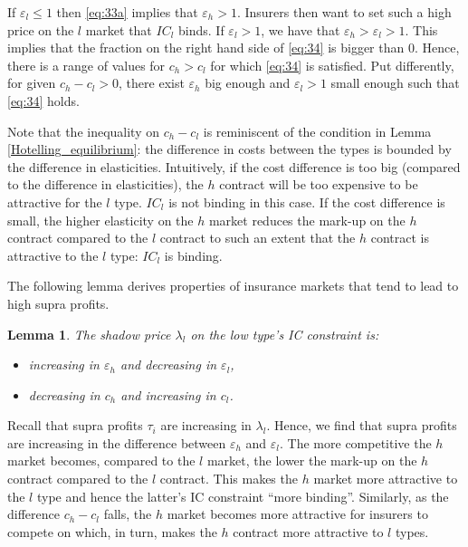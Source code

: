 \documentclass[a4paper,12pt]{article}
\newtheorem{lemma}{Lemma}
\begin{document}
If \(\varepsilon_l \leq 1\) then \eqref{eq:33a} implies that \(\varepsilon_h > 1\). Insurers then want to set such a high price on the \(l\) market that \(IC_l\) binds. If \(\varepsilon_l > 1\), we have that \(\varepsilon_h > \varepsilon_l>1\). This implies that the fraction on the right hand side of \eqref{eq:34} is bigger than 0. Hence, there is a range of values for \(c_h>c_l\) for which \eqref{eq:34} is satisfied. Put differently, for given \(c_h-c_l>0\), there exist \(\varepsilon_h\) big enough and \(\varepsilon_l>1\) small enough such that \eqref{eq:34} holds.

Note that the inequality on \(c_h-c_l\) is reminiscent of the condition in Lemma \ref{Hotelling_equilibrium}: the difference in costs between the types is bounded by the difference in elasticities. Intuitively, if the cost difference is too big (compared to the difference in elasticities), the \(h\) contract will be too expensive to be attractive for the \(l\) type. \(IC_l\) is not binding in this case. If the cost difference is small, the higher elasticity on the \(h\) market reduces the mark-up on the \(h\) contract compared to the \(l\) contract to such an extent that the \(h\) contract is attractive to the \(l\) type: \(IC_l\) is binding.

The following lemma derives properties of insurance markets that tend to lead to high supra profits.

\begin{lemma}
\label{Comparative_static_lambda}
The shadow price \(\lambda_l\) on the low type's IC constraint is:
\begin{itemize}
\item increasing in \(\varepsilon_h\) and decreasing in \(\varepsilon_l\),
\item decreasing in \(c_h\) and increasing in \(c_l\).
\end{itemize}
\end{lemma}

Recall that supra profits \(\tau_i\) are increasing in \(\lambda_l\). Hence, we find that supra profits are increasing in the difference between \(\varepsilon_h\) and \(\varepsilon_l\). The more competitive the \(h\) market becomes, compared to the \(l\) market, the lower the mark-up on the \(h\) contract compared to the \(l\) contract. This makes the \(h\) market more attractive to the \(l\) type and hence the latter's IC constraint ``more binding''. Similarly, as the difference \(c_h-c_l\) falls, the \(h\) market becomes more attractive for insurers to compete on which, in turn, makes the \(h\) contract more attractive to \(l\) types.
\end{document}
